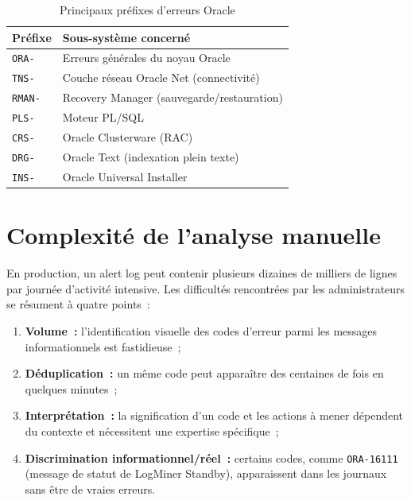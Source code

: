 \documentclass[12pt,a4paper]{report}
\begin{document}
\begin{table}[H]
  \centering
  \caption{Principaux pr\'efixes d'erreurs Oracle}
  \label{tab:prefixes}
  \begin{tabularx}{\textwidth}{lX}
    \toprule
    \textbf{Pr\'efixe} & \textbf{Sous-syst\`eme concern\'e} \\
    \midrule
    \texttt{ORA-}  & Erreurs g\'en\'erales du noyau Oracle \\
    \texttt{TNS-}  & Couche r\'eseau Oracle Net (connectivit\'e) \\
    \texttt{RMAN-} & Recovery Manager (sauvegarde/restauration) \\
    \texttt{PLS-}  & Moteur PL/SQL \\
    \texttt{CRS-}  & Oracle Clusterware (RAC) \\
    \texttt{DRG-}  & Oracle Text (indexation plein texte) \\
    \texttt{INS-}  & Oracle Universal Installer \\
    \bottomrule
  \end{tabularx}
\end{table}

\section{Complexit\'e de l'analyse manuelle}

En production, un alert log peut contenir plusieurs dizaines de milliers de lignes
par journ\'ee d'activit\'e intensive. Les difficult\'es rencontr\'ees par les administrateurs
se r\'esument \`a quatre points~:

\begin{enumerate}[leftmargin=*]
  \item \textbf{Volume~:} l'identification visuelle des codes d'erreur parmi les messages
        informationnels est fastidieuse~;
  \item \textbf{D\'eduplication~:} un m\^eme code peut appara\^itre des centaines de fois
        en quelques minutes~;
  \item \textbf{Interpr\'etation~:} la signification d'un code et les actions \`a mener
        d\'ependent du contexte et n\'ecessitent une expertise sp\'ecifique~;
  \item \textbf{Discrimination informationnel/r\'eel~:} certains codes, comme
        \texttt{ORA-16111} (message de statut de LogMiner Standby), apparaissent dans
        les journaux sans \^etre de vraies erreurs.
\end{enumerate}
\end{document}
